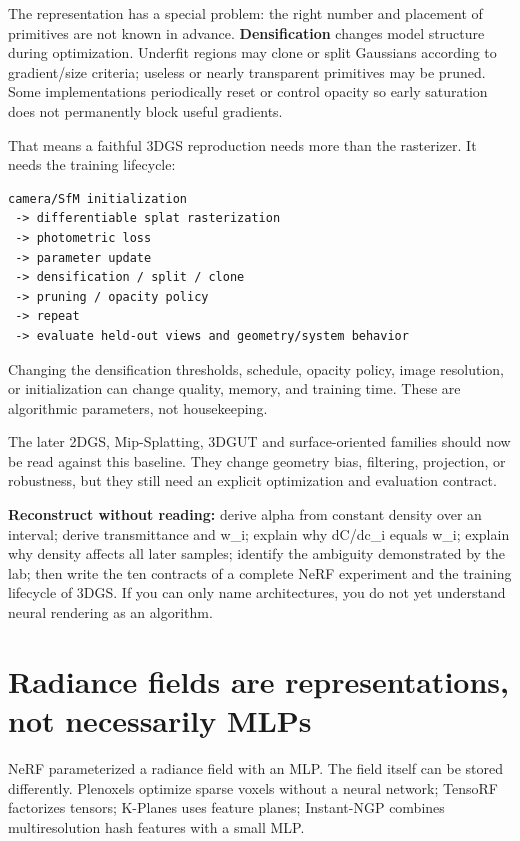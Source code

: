 The representation has a special problem: the right number and placement of primitives are not known in advance. \textbf{Densification} changes model structure during optimization. Underfit regions may clone or split Gaussians according to gradient/size criteria; useless or nearly transparent primitives may be pruned. Some implementations periodically reset or control opacity so early saturation does not permanently block useful gradients.

That means a faithful 3DGS reproduction needs more than the rasterizer. It needs the training lifecycle:

\begin{verbatim}
camera/SfM initialization
 -> differentiable splat rasterization
 -> photometric loss
 -> parameter update
 -> densification / split / clone
 -> pruning / opacity policy
 -> repeat
 -> evaluate held-out views and geometry/system behavior
\end{verbatim}

Changing the densification thresholds, schedule, opacity policy, image resolution, or initialization can change quality, memory, and training time. These are algorithmic parameters, not housekeeping.

The later 2DGS, Mip-Splatting, 3DGUT and surface-oriented families should now be read against this baseline. They change geometry bias, filtering, projection, or robustness, but they still need an explicit optimization and evaluation contract.

\textbf{Reconstruct without reading:} derive alpha from constant density over an interval; derive transmittance and w\_i; explain why dC/dc\_i equals w\_i; explain why density affects all later samples; identify the ambiguity demonstrated by the lab; then write the ten contracts of a complete NeRF experiment and the training lifecycle of 3DGS. If you can only name architectures, you do not yet understand neural rendering as an algorithm.

\section{Radiance fields are representations, not necessarily MLPs}\label{04-visual-computing-ii-ch035-radiance-fields-are-representations-not-necessarily-mlps}

NeRF parameterized a radiance field with an MLP. The field itself can be stored differently. Plenoxels optimize sparse voxels without a neural network; TensoRF factorizes tensors; K-Planes uses feature planes; Instant-NGP combines multiresolution hash features with a small MLP.

